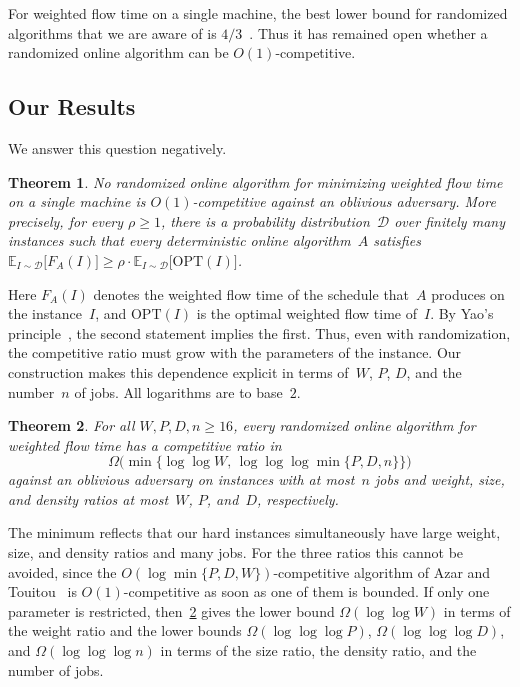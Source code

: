 \documentclass[11pt,letterpaper]{article}
\newtheorem{theorem}{Theorem}[section]
\theoremstyle{definition}
\theoremstyle{remark}
\newcommand{\OPT}{{\mathrm{OPT}}}
\newcommand{\E}{\mathbb{E}}
\newcommand{\cD}{\mathcal{D}}
\begin{document}
For weighted flow time on a single machine, the best lower bound for randomized algorithms that we are aware of is $4/3$~\cite{ChekuriKZ01,EpsteinS03}. Thus it has remained open whether a randomized online algorithm can be $O(1)$-competitive.

\subsection{Our Results}
We answer this question negatively.

\begin{theorem}\label{thm:main}
No randomized online algorithm for minimizing weighted flow time on a single machine is $O(1)$-competitive against an oblivious adversary. More precisely, for every $\rho\ge1$, there is a probability distribution~$\cD$ over finitely many instances such that every deterministic online algorithm~$A$ satisfies $\E_{I\sim\cD}\bigl[F_A(I)\bigr]\ge \rho\cdot\E_{I\sim\cD}\bigl[\OPT(I)\bigr]$.
\end{theorem}

Here $F_A(I)$ denotes the weighted flow time of the schedule that~$A$ produces on the instance~$I$, and $\OPT(I)$ is the optimal weighted flow time of~$I$. By Yao's principle~\cite{Yao77}, the second statement implies the first.
%
Thus, even with randomization, the competitive ratio must grow with the parameters of the instance. Our construction makes this dependence explicit in terms of~$W$, $P$, $D$, and the number~$n$ of jobs. All logarithms are to base~$2$.

\begin{theorem}\label{thm:quant}
For all $W,P,D,n\ge16$, every randomized online algorithm for weighted flow time has a competitive ratio in
\begin{equation*}
  \Omega\bigl(\min\{\log\log W,\,\log\log\log\min\{P,D,n\}\}\bigr)
\end{equation*}
against an oblivious adversary on instances with at most~$n$ jobs and weight, size, and density ratios at most~$W$, $P$, and~$D$, respectively.
\end{theorem}

The minimum reflects that our hard instances simultaneously have large weight, size, and density ratios and many jobs. For the three ratios this cannot be avoided, since the $O(\log\min\{P,D,W\})$-competitive algorithm of Azar and Touitou~\cite{AzarT18} is $O(1)$-competitive as soon as one of them is bounded. If only one parameter is restricted, then~\cref{thm:quant} gives the lower bound $\Omega(\log\log W)$ in terms of the weight ratio and the lower bounds $\Omega(\log\log\log P)$, $\Omega(\log\log\log D)$, and $\Omega(\log\log\log n)$ in terms of the size ratio, the density ratio, and the number of jobs.
\end{document}
